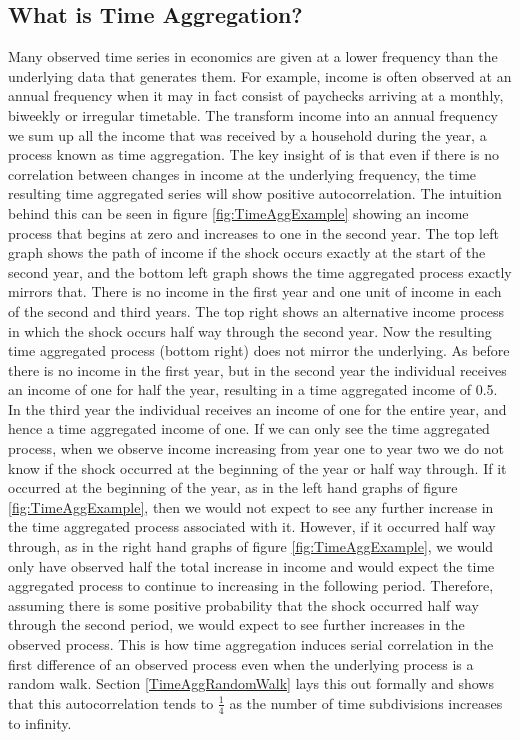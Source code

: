 \documentclass[titlepage]{\econtex}\newcommand{\texname}{BPP_TimeAgg}
\begin{document}
\subsection{What is Time Aggregation?}
Many observed time series in economics are given at a lower frequency than the underlying data that generates them. For example, income is often observed at an annual frequency when it may in fact consist of paychecks arriving at a monthly, biweekly or irregular timetable. The transform income into an annual frequency we sum up all the income that was received by a household during the year, a process known as time aggregation. The key insight of \cite{working_note_1960} is that even if there is no correlation between changes in income at the underlying frequency, the time resulting time aggregated series will show positive autocorrelation. The intuition behind this can be seen in figure \ref{fig:TimeAggExample} showing an income process that begins at zero and increases to one in the second year. The top left graph shows the path of income if the shock occurs exactly at the start of the second year, and the bottom left graph shows the time aggregated process exactly mirrors that. There is no income in the first year and one unit of income in each of the second and third years. The top right shows an alternative income process in which the shock occurs half way through the second year. Now the resulting time aggregated process (bottom right) does not mirror the underlying. As before there is no income in the first year, but in the second year the individual receives an income of one for half the year, resulting in a time aggregated income of 0.5. In the third year the individual receives an income of one for the entire year, and hence a time aggregated income of one. If we can only see the time aggregated process, when we observe income increasing from year one to year two we do not know if the shock occurred at the beginning of the year or half way through. If it occurred at the beginning of the year, as in the left hand graphs of figure \ref{fig:TimeAggExample}, then we would not expect to see any further increase in the time aggregated process associated with it. However, if it occurred half way through, as in the right hand graphs of figure \ref{fig:TimeAggExample}, we would only have observed half the total increase in income and would expect the time aggregated process to continue to increasing in the following period. Therefore, assuming there is some positive probability that the shock occurred half way through the second period, we would expect to see further increases in the observed process. This is how time aggregation induces serial correlation in the first difference of an observed process even when the underlying process is a random walk. Section \ref{TimeAggRandomWalk} lays this out formally and shows that this autocorrelation tends to $\frac{1}{4}$ as the number of time subdivisions increases to infinity.
\end{document}
